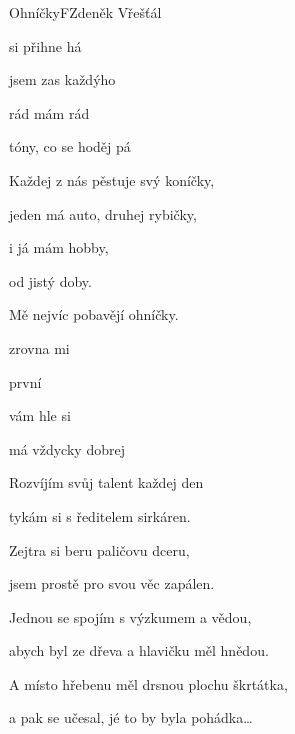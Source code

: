 \begin{song}{Ohníčky}{F}{Zdeněk Vřešťál}

\begin{SBVerse}

 si  přihne há

jsem zas každýho 

 rád  mám rád 

tóny, co se hoděj  pá

\end{SBVerse}

\begin{SBVerse}

Každej z nás pěstuje svý koníčky,

jeden má auto, druhej rybičky,

i já mám hobby,

od jistý doby.

Mě nejvíc pobavějí ohníčky.

\end{SBVerse}

\begin{SBChorus*}

zrovna  mi  

první   

 vám  hle si 

 má vždycky dobrej  

\end{SBChorus*}

\begin{SBVerse}

Rozvíjím svůj talent každej den

tykám si s ředitelem sirkáren.

Zejtra si beru paličovu dceru,

jsem prostě pro svou věc zapálen.

\end{SBVerse}

\begin{SBChorus*}

Jednou se spojím s výzkumem a vědou,

abych byl ze dřeva a hlavičku měl hnědou.

A místo hřebenu měl drsnou plochu škrtátka,

a pak se učesal, jé to by byla pohádka…

\end{SBChorus*}

\end{song}

\pagebreak